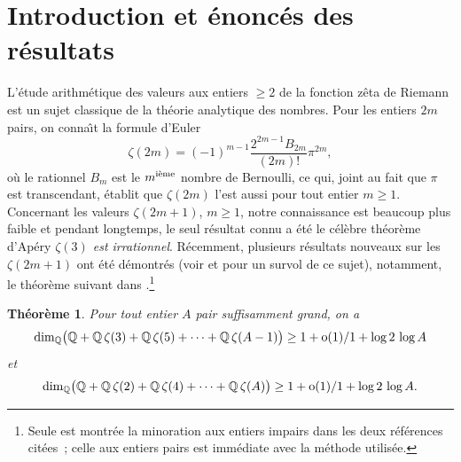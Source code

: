 \documentclass[12pt]{amsart}
\newtheorem{theo}{Th{\'e}or{\`e}me}
\theoremstyle{remark}
\numberwithin{equation}{section}
\begin{document}
\maketitle

\newpage

\section{Introduction et {\'e}nonc{\'e}s des r{\'e}sultats}
L'{\'e}tude arithm{\'e}tique des valeurs aux entiers $\ge 2$ de la
fonction z{\^e}ta de Riemann est un sujet classique de la th{\'e}orie
analytique des nombres. 
Pour les entiers $2m$ pairs, 
on conna{\^\i}t la formule d'Euler
\begin{equation} \label{eq:Euler} 
\zeta(2m)=(-1)^{m-1}\frac {2^{2m-1}B_{2m}} {(2m)!}\pi^{2m},
\end{equation}
o{\`u} le rationnel $B_m$ est le $m^{\textup{i{\`e}me}}$ nombre de Bernoulli,  
ce qui, joint au fait que $\pi$ est transcendant, {\'e}tablit
que $\zeta(2m)$ l'est aussi pour tout entier $m\ge1$. Concernant les valeurs
$\zeta(2m+1)$, $m\ge1$, notre connaissance est beaucoup plus
faible et pendant longtemps, le seul r{\'e}sultat connu a {\'e}t{\'e} le c{\'e}l{\`e}bre th{\'e}or{\`e}me 
d'Ap{\'e}ry \cite{ap} {\it {\og $\zeta(3)$ est irrationnel\fg}}. R{\'e}cemment, plusieurs 
r{\'e}sultats nouveaux sur les $\zeta(2m+1)$ ont {\'e}t{\'e} d{\'e}montr{\'e}s (voir 
\cite{ri,br,ri1,ri2,zud0} et \cite{fi} pour un survol de ce sujet), 
notamment,  le
th{\'e}or{\`e}me suivant dans \cite{ri, br}.\footnote{Seule est montr{\'e}e 
la minoration aux entiers impairs dans les deux r{\'e}f{\'e}rences
cit{\'e}es~; celle aux entiers pairs est imm{\'e}diate avec la m{\'e}thode utilis{\'e}e.}


\begin{theo} \label{th:rivoal}  
Pour tout entier $A$ pair suffisamment grand, on a
$$
\dim_{\mathbb{Q}} \bigl(\mathbb{Q}+\mathbb{Q}\, 
\zeta(3)+ \mathbb{Q} \,\zeta(5)+ \cdots +
\mathbb{Q}\, \zeta(A-1)\bigr)\ge 
\frac{1+\textup{o}(1)}{1+\log 2}\, \log A
$$
et 
$$
\dim_{\mathbb{Q}} \bigl(\mathbb{Q}+\mathbb{Q}\, 
\zeta(2)+ \mathbb{Q} \,\zeta(4)+ \cdots + 
\mathbb{Q}\, \zeta(A)\bigr)\ge 
\frac{1+\textup{o}(1)}{1+\log 2}\, \log A.
$$
\end{theo}
\end{document}
